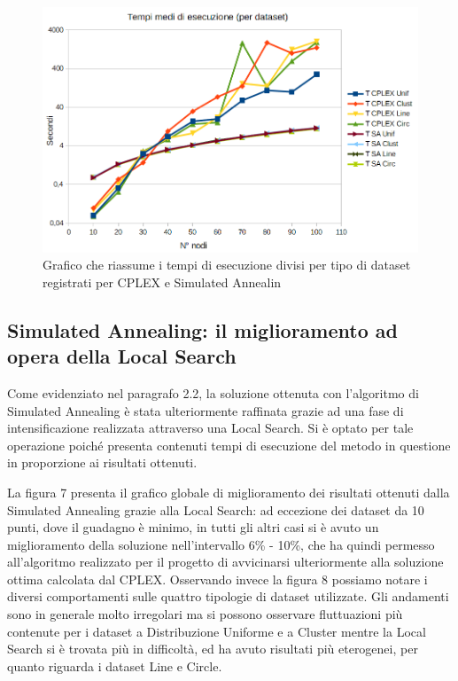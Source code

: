 \documentclass[preprint,12pt]{elsarticle}
\begin{document}
\begin{figure}[htbp]
\centering
\includegraphics[scale=0.50]{grafici_confronti/tempi_di_esecuzione.png} 
\caption{Grafico che riassume i tempi di esecuzione divisi per tipo di dataset registrati per CPLEX e Simulated Annealin}\label{fig:6}
\end{figure}

\subsection{\textbf{Simulated Annealing: il miglioramento ad opera della Local Search}}

Come evidenziato nel paragrafo 2.2, la soluzione ottenuta con l'algoritmo di Simulated Annealing è stata ulteriormente raffinata grazie ad una fase di intensificazione realizzata attraverso una Local Search. Si è optato per tale operazione poiché presenta contenuti tempi di esecuzione del metodo in questione in proporzione ai risultati ottenuti. 

La figura 7 presenta il grafico globale di miglioramento dei risultati ottenuti dalla Simulated Annealing grazie alla Local Search: ad eccezione dei dataset da 10 punti, dove il guadagno è minimo, in tutti gli altri casi si è avuto un miglioramento della soluzione nell'intervallo 6\% - 10\%, che ha quindi permesso all'algoritmo realizzato per il progetto di avvicinarsi ulteriormente alla soluzione ottima calcolata dal CPLEX. Osservando invece la figura 8 possiamo notare i diversi comportamenti sulle quattro tipologie di dataset utilizzate. Gli andamenti sono in generale molto irregolari ma si possono osservare fluttuazioni più contenute per i dataset a Distribuzione Uniforme e a Cluster mentre la Local Search si è trovata più in difficoltà, ed ha avuto risultati più eterogenei, per quanto riguarda i dataset Line e Circle.
\end{document}
